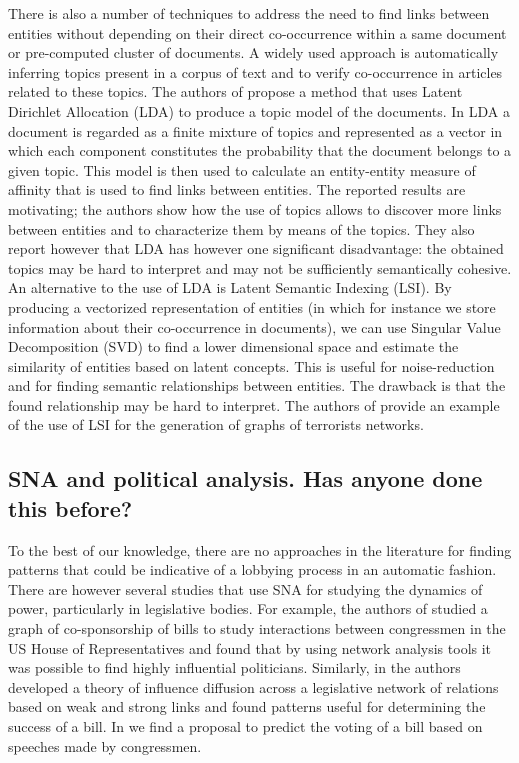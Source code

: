 There is also a number of techniques to address the need to find links between entities without depending on their direct co-occurrence within a same document or pre-computed cluster of documents. A widely used approach is automatically inferring topics present in a corpus of text and to verify co-occurrence in articles related to these topics. The authors of  \cite{lda-topics-entities} propose a method that uses Latent Dirichlet Allocation (LDA) to produce a topic model of the documents. In LDA a document is regarded as a finite mixture of topics and represented as a vector in which each component constitutes the probability that the document belongs to a given topic. This model is then used to calculate an entity-entity measure of affinity that is used to find links between entities. The reported results are motivating; the authors show how the use of topics allows to discover more links between entities and to characterize them by means of the topics. They also report however that LDA has however one significant disadvantage: the obtained topics may be hard to interpret and may not be sufficiently semantically cohesive. \\

An alternative to the use of LDA is Latent Semantic Indexing (LSI). By producing a vectorized representation of entities (in which for instance we store information about their co-occurrence in documents), we can use Singular Value Decomposition (SVD) to find a lower dimensional space and estimate the similarity of entities based on latent concepts. This is useful for noise-reduction and for finding semantic relationships between entities. The drawback is that the found relationship may be hard to interpret. The authors of \cite{latent_semantic-index-terrorism} provide an example of the use of LSI for the generation of graphs of terrorists networks.\\

\subsection{SNA and political analysis. Has anyone done this before?}\label{sna-politics}

To the best of our knowledge, there are no approaches in the literature for finding patterns that could be indicative of a lobbying process in an automatic fashion. There are however several studies that use SNA for studying the dynamics of power, particularly in legislative bodies. For example, the authors of \cite{fowler2006connecting} studied a graph of co-sponsorship of bills to study interactions between congressmen in the US House of Representatives and found that by using network analysis tools it was possible to find highly influential politicians. Similarly, in \cite{kirkland2011relational} the authors  developed a theory of influence diffusion across a legislative network of relations based on weak and strong links and found patterns useful for determining the success of a bill. In \cite{thomas2006get} we find a proposal to predict the voting of a bill based on speeches made by congressmen. \\

